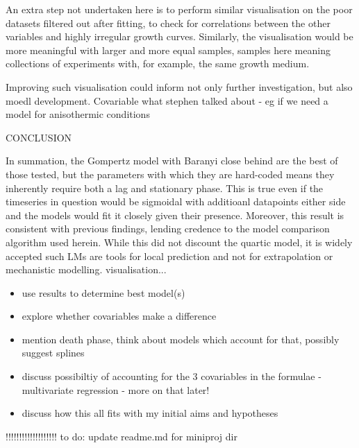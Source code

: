 \documentclass[11pt]{article}
\begin{document}
An extra step not undertaken here is to perform similar visualisation on the poor datasets filtered out after fitting, to check for correlations between the other variables and highly irregular growth curves. Similarly, the visualisation would be more meaningful with larger and more equal samples, samples here meaning collections of experiments with, for example, the same growth medium.

Improving such visualisation could inform not only further investigation, but also moedl development. Covariable 
what stephen talked about - eg if we need a model for anisothermic conditions



CONCLUSION

In summation, the Gompertz model with Baranyi close behind are the best of those tested, but the parameters with which they are hard-coded means they inherently require both a lag and stationary phase. This is true even if the timeseries in question would be sigmoidal with additioanl datapoints either side and the models would fit it closely given their presence. Moreover, this result is consistent with previous findings, lending credence to the model comparison algorithm used herein. While this did not discount the quartic model, it is widely accepted such LMs are tools for local prediction and not for extrapolation or mechanistic modelling. visualisation...

\begin{itemize}
    \item use results to determine best model(s)
    \item explore whether covariables make a difference
    \item mention death phase, think about models which account for that, possibly suggest splines
    \item discuss possibiltiy of accounting for the 3 covariables in the formulae - multivariate regression - more on that later!
    \item discuss how this all fits with my initial aims and hypotheses
\end{itemize}



!!!!!!!!!!!!!!!!!!!
to do: update readme.md for miniproj dir
\newpage

\printbibliography[heading=bibintoc]
\end{document}
